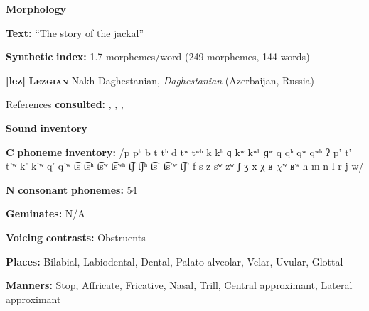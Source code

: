 \documentclass[output=paper]{langsci/langscibook}
\begin{document}
\begin{styleBody}
\textbf{Morphology}
\end{styleBody}

\begin{styleBody}
\textbf{Text:} “The story of the jackal” \citep[165-168]{Plaisier2007}
\end{styleBody}

\begin{styleBody}
\textbf{Synthetic} \textbf{index:} 1.7 morphemes/word (249 morphemes, 144 words)
\end{styleBody}

\begin{styleBody}
\textbf{[lez]}   \textbf{\textsc{Lezgian}}  Nakh-Daghestanian, \textit{Daghestanian} (Azerbaijan, Russia)
\end{styleBody}

\begin{styleBody}
References \textbf{consulted:} \citet{ChitoranBabaliyeva2007}, \citet{Haspelmath1993}, \citet{Kodzasov1990}, \citet{Yu2004}
\end{styleBody}

\begin{styleBody}
\textbf{Sound} \textbf{inventory}
\end{styleBody}

\begin{styleBody}
\textbf{C} \textbf{phoneme} \textbf{inventory:} /p pʰ b t tʰ d tʷ tʷʰ k kʰ ɡ kʷ kʷʰ ɡʷ q qʰ qʷ qʷʰ ʔ p’ t’ t’ʷ k’ k’ʷ q’ q’ʷ t͡s t͡sʰ t͡sʷ t͡sʷʰ t͡ʃ t͡ʃʰ t͡s’ t͡s’ʷ t͡ʃ’ f s z sʷ zʷ ʃ ʒ x χ ʁ $\chi ʷ$ ʁʷ h m n l r j w/
\end{styleBody}

\begin{styleBody}
\textbf{N} \textbf{consonant} \textbf{phonemes:} 54
\end{styleBody}

\begin{styleBody}
\textbf{Geminates:} N/A
\end{styleBody}

\begin{styleBody}
\textbf{Voicing} \textbf{contrasts:} Obstruents
\end{styleBody}

\begin{styleBody}
\textbf{Places:} Bilabial, Labiodental, Dental, Palato-alveolar, Velar, Uvular, Glottal
\end{styleBody}

\begin{styleBody}
\textbf{Manners:} Stop, Affricate, Fricative, Nasal, Trill, Central approximant, Lateral approximant
\end{styleBody}
\end{document}

